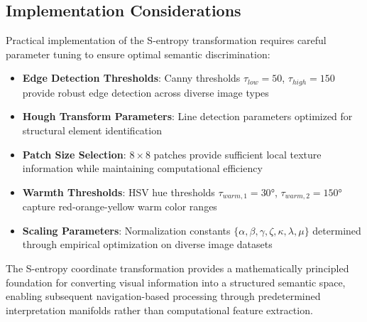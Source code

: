 \subsection{Implementation Considerations}

Practical implementation of the S-entropy transformation requires careful parameter tuning to ensure optimal semantic discrimination:

\begin{itemize}
\item \textbf{Edge Detection Thresholds}: Canny thresholds $\tau_{low} = 50$, $\tau_{high} = 150$ provide robust edge detection across diverse image types
\item \textbf{Hough Transform Parameters}: Line detection parameters optimized for structural element identification
\item \textbf{Patch Size Selection}: $8 \times 8$ patches provide sufficient local texture information while maintaining computational efficiency  
\item \textbf{Warmth Thresholds}: HSV hue thresholds $\tau_{warm,1} = 30°$, $\tau_{warm,2} = 150°$ capture red-orange-yellow warm color ranges
\item \textbf{Scaling Parameters}: Normalization constants $\{\alpha, \beta, \gamma, \zeta, \kappa, \lambda, \mu\}$ determined through empirical optimization on diverse image datasets
\end{itemize}

The S-entropy coordinate transformation provides a mathematically principled foundation for converting visual information into a structured semantic space, enabling subsequent navigation-based processing through predetermined interpretation manifolds rather than computational feature extraction.

